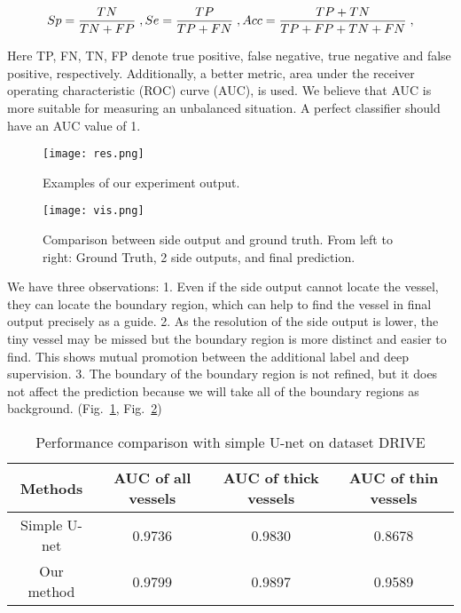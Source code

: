 \documentclass[runningheads,a4paper]{llncs}
\begin{document}
\begin{equation}
	\vspace{-5pt}
	Sp = \frac{TN}{TN+FP}\; , Se=\frac{TP}{TP+FN}\; , Acc=\frac{TP+TN}{TP+FP+TN+FN} \; ,
	\vspace{-0pt}
\end{equation}

Here TP, FN, TN, FP denote true positive, false negative, true negative and false positive, respectively. Additionally, a better metric, area under the receiver operating characteristic (ROC) curve (AUC), is used. We believe that AUC is more suitable for measuring an unbalanced situation. A perfect classifier should have an AUC value of 1.

\begin{figure}[h]
	\centering
	\vspace{-15pt}
	\texttt{[image: res.png]}
	\vspace{-5pt}
	\caption{Examples of our experiment output. }
	\vspace{-15pt}
	\label{fig:res}
\end{figure}

\begin{figure}[h]
	\centering
	\vspace{-20pt}
	\texttt{[image: vis.png]}
	\caption{Comparison between side output and ground truth. From left to right: Ground Truth, 2 side outputs, and final prediction.}
	\vspace{-15pt}
	\label{fig:vis}
\end{figure}

We have three observations: 1. Even if the side output cannot locate the vessel, they can locate the boundary region, which can help to find the vessel in final output precisely as a guide. 2. As the resolution of the side output is lower, the tiny vessel may be missed but the boundary region is more distinct and easier to find. This shows mutual promotion between the additional label and deep supervision. 3. The boundary of the boundary region is not refined, but it does not affect the prediction because we will take all of the boundary regions as background. (Fig.~\ref{fig:res}, Fig.~\ref{fig:vis})

\begin{table}[h]
	\centering
	\vspace{-10pt}
	\caption{Performance comparison with simple U-net on dataset DRIVE}
	\begin{tabular}{cccc}
		\toprule
		Methods&AUC of all vessels&AUC of thick vessels&AUC of thin vessels\\
		\midrule	
		Simple U-net&0.9736&0.9830&0.8678\\
		Our method&0.9799&0.9897&0.9589\\
		\bottomrule
	\end{tabular}
	\vspace{-10pt}
	\label{table1}
\end{table}
\end{document}
